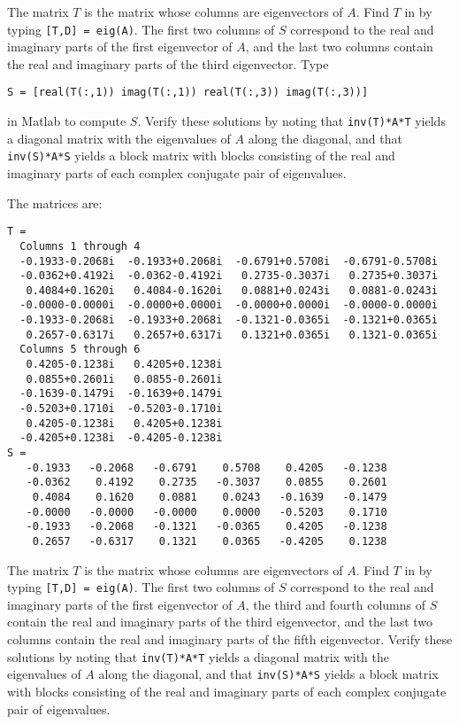 \soln The matrix $T$ is the matrix whose columns are eigenvectors of $A$. 
Find $T$ in \Matlab by typing {\tt [T,D] = eig(A)}.  The first two columns
of $S$ correspond to the real and imaginary parts of the first eigenvector
of $A$, and the last two columns contain the real and imaginary parts of
the third eigenvector.  Type 
\begin{verbatim}
S = [real(T(:,1)) imag(T(:,1)) real(T(:,3)) imag(T(:,3))]   
\end{verbatim}
in Matlab to compute $S$.  Verify these solutions by noting that
{\tt inv(T)*A*T} yields a diagonal matrix with the eigenvalues of $A$
along the diagonal, and that {\tt inv(S)*A*S} yields a block matrix
with blocks consisting of the real and imaginary parts of each complex
conjugate pair of eigenvalues.

\newpage
{}
\ans The matrices are:
\begin{verbatim}
T =
  Columns 1 through 4 
  -0.1933-0.2068i  -0.1933+0.2068i  -0.6791+0.5708i  -0.6791-0.5708i
  -0.0362+0.4192i  -0.0362-0.4192i   0.2735-0.3037i   0.2735+0.3037i
   0.4084+0.1620i   0.4084-0.1620i   0.0881+0.0243i   0.0881-0.0243i
  -0.0000-0.0000i  -0.0000+0.0000i  -0.0000+0.0000i  -0.0000-0.0000i
  -0.1933-0.2068i  -0.1933+0.2068i  -0.1321-0.0365i  -0.1321+0.0365i
   0.2657-0.6317i   0.2657+0.6317i   0.1321+0.0365i   0.1321-0.0365i
  Columns 5 through 6 
   0.4205-0.1238i   0.4205+0.1238i
   0.0855+0.2601i   0.0855-0.2601i
  -0.1639-0.1479i  -0.1639+0.1479i
  -0.5203+0.1710i  -0.5203-0.1710i
   0.4205-0.1238i   0.4205+0.1238i
  -0.4205+0.1238i  -0.4205-0.1238i
S =
   -0.1933   -0.2068   -0.6791    0.5708    0.4205   -0.1238
   -0.0362    0.4192    0.2735   -0.3037    0.0855    0.2601
    0.4084    0.1620    0.0881    0.0243   -0.1639   -0.1479
   -0.0000   -0.0000   -0.0000    0.0000   -0.5203    0.1710
   -0.1933   -0.2068   -0.1321   -0.0365    0.4205   -0.1238
    0.2657   -0.6317    0.1321    0.0365   -0.4205    0.1238
\end{verbatim}

\soln The matrix $T$ is the matrix whose columns are eigenvectors of $A$. 
Find $T$ in \Matlab by typing {\tt [T,D] = eig(A)}.  The first two columns
of $S$ correspond to the real and imaginary parts of the first eigenvector
of $A$, the third and fourth columns of $S$ contain the real and imaginary parts of 
the third eigenvector, and the last two columns contain the real and imaginary 
parts of the fifth eigenvector.  Verify these solutions by noting that
{\tt inv(T)*A*T} yields a diagonal matrix with the eigenvalues of $A$
along the diagonal, and that {\tt inv(S)*A*S} yields a block matrix
with blocks consisting of the real and imaginary parts of each complex
conjugate pair of eigenvalues.


